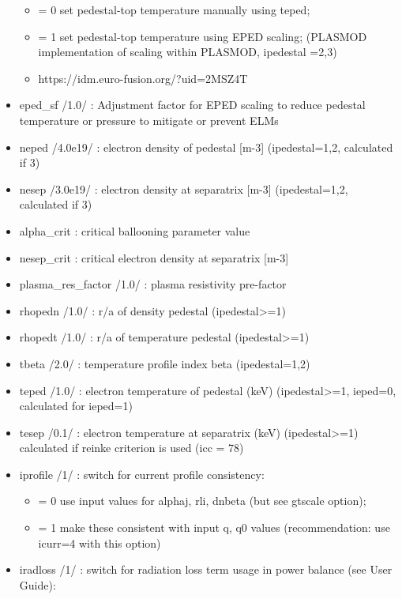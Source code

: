 \documentclass[]{article}
\providecommand{\tightlist}{%
  \setlength{\itemsep}{0pt}\setlength{\parskip}{0pt}}
\begin{document}
\begin{itemize}
  \begin{itemize}
  \tightlist
  \item
    = 0 set pedestal-top temperature manually using teped;
  \item
    = 1 set pedestal-top temperature using EPED scaling; (PLASMOD
    implementation of scaling within PLASMOD, ipedestal =2,3)
  \item
    https://idm.euro-fusion.org/?uid=2MSZ4T
  \end{itemize}
\item
  eped\_sf /1.0/ : Adjustment factor for EPED scaling to reduce pedestal
  temperature or pressure to mitigate or prevent ELMs
\item
  neped /4.0e19/ : electron density of pedestal {[}m-3{]}
  (ipedestal=1,2, calculated if 3)
\item
  nesep /3.0e19/ : electron density at separatrix {[}m-3{]}
  (ipedestal=1,2, calculated if 3)
\item
  alpha\_crit : critical ballooning parameter value
\item
  nesep\_crit : critical electron density at separatrix {[}m-3{]}
\item
  plasma\_res\_factor /1.0/ : plasma resistivity pre-factor
\item
  rhopedn /1.0/ : r/a of density pedestal (ipedestal\textgreater{}=1)
\item
  rhopedt /1.0/ : r/a of temperature pedestal
  (ipedestal\textgreater{}=1)
\item
  tbeta /2.0/ : temperature profile index beta (ipedestal=1,2)
\item
  teped /1.0/ : electron temperature of pedestal (keV)
  (ipedestal\textgreater{}=1, ieped=0, calculated for ieped=1)
\item
  tesep /0.1/ : electron temperature at separatrix (keV)
  (ipedestal\textgreater{}=1) calculated if reinke criterion is used
  (icc = 78)
\item
  iprofile /1/ : switch for current profile consistency:

  \begin{itemize}
  \tightlist
  \item
    = 0 use input values for alphaj, rli, dnbeta (but see gtscale
    option);
  \item
    = 1 make these consistent with input q, q0 values (recommendation:
    use icurr=4 with this option)
  \end{itemize}
\item
  iradloss /1/ : switch for radiation loss term usage in power balance
  (see User Guide):


\end{itemize}
\end{document}
